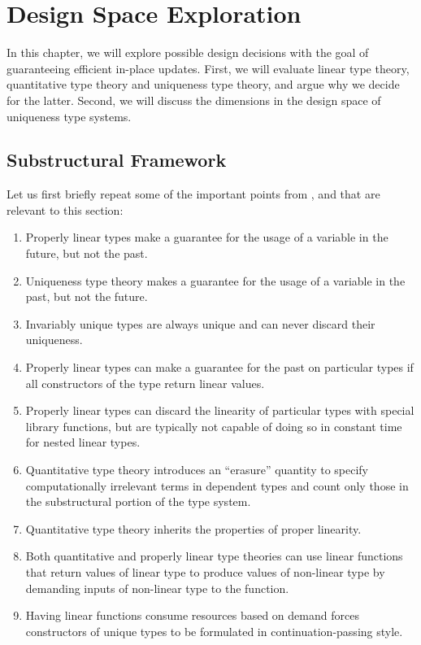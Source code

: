 \chapter{Design Space Exploration}\label{sec:designspace}
In this chapter, we will explore possible design decisions with the goal of guaranteeing efficient in-place updates. First, we will evaluate linear type theory, quantitative type theory and uniqueness type theory, and argue why we decide for the latter. Second, we will discuss the dimensions in the design space of uniqueness type systems.

\section{Substructural Framework}
Let us first briefly repeat some of the important points from ,  and  that are relevant to this section:
\begin{enumerate}
	\item Properly linear types make a guarantee for the usage of a variable in the future, but not the past.
	\item Uniqueness type theory makes a guarantee for the usage of a variable in the past, but not the future.
	\item Invariably unique types are always unique and can never discard their uniqueness.
	\item Properly linear types can make a guarantee for the past on particular types if all constructors of the type return linear values.
	\item Properly linear types can discard the linearity of particular types with special library functions, but are typically not capable of doing so in constant time for nested linear types.
	\item Quantitative type theory introduces an ``erasure'' quantity to specify computationally irrelevant terms in dependent types and count only those in the substructural portion of the type system.
	\item Quantitative type theory inherits the properties of proper linearity.
	\item Both quantitative and properly linear type theories can use linear functions that return values of linear type to produce values of non-linear type by demanding inputs of non-linear type to the function.
	\item Having linear functions consume resources based on demand forces constructors of unique types to be formulated in continuation-passing style.
\end{enumerate}

